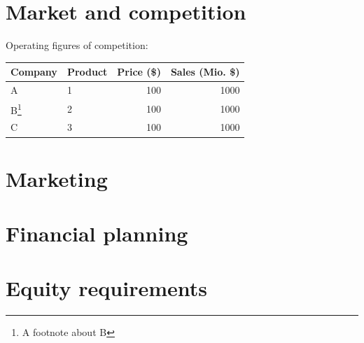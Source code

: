 \documentclass[a4paper,11pt]{article}
\begin{document}
\begin{CJK}{UTF8}{gbsn}
  \section{Market and competition}
  Operating figures of competition:
  \begin{center}
    \begin{tabular}{l|l|r|r}
      Company & Product & Price (\$) & \pbox{20cm}{Sales\\(Mio. \$)}\\
      \hline
      A & 1 & 100 & 1000\\
      B\footnote{A footnote about B} & 2 & 100 & 1000\\
      C & 3 & 100 & 1000\\
    \end{tabular}
  \end{center}

  \section{Marketing}

  \section{Financial planning}

  \section{Equity requirements}

  \clearpage\end{CJK}
\end{document}
